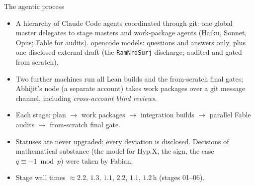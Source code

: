 \begin{frame}{The agentic process}
  \small
  \begin{itemize}\setlength{\itemsep}{3pt}
    \item A hierarchy of Claude Code agents coordinated through git: one global master delegates to stage masters and work-package
      agents (Haiku, Sonnet, Opus; Fable for audits). opencode models: questions and answers only, plus one disclosed external
      draft (the \texttt{RamNrdSurj} discharge; audited and gated from scratch).
    \item Two further machines run all Lean builds and the from-scratch final gates; Abhijit's node (a separate account) takes work
      packages over a git message channel, including \emph{cross-account blind reviews}.
    \item Each stage: plan $\to$ work packages $\to$ integration builds $\to$ parallel Fable audits $\to$ from-scratch final gate.
    \item Statuses are never upgraded; every deviation is disclosed. Decisions of mathematical substance (the model for Hyp.X, the sign,
      the case $q\equiv-1\bmod p$) were taken by Fabian.
    \item Stage wall times $\approx2.2$, $1.3$, $1.1$, $2.2$, $1.1$, $1.2$\,h (stages 01--06).
  \end{itemize}
\end{frame}
